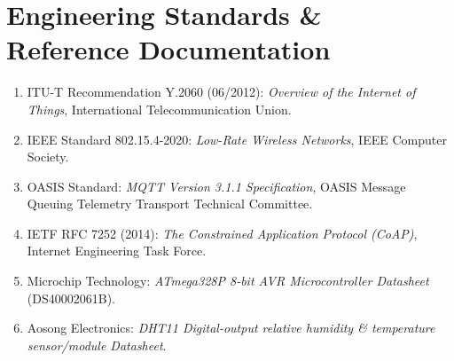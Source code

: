 \documentclass[11pt,a4paper]{article}
\begin{document}
\newpage

\section{Engineering Standards \& Reference Documentation}
\begin{enumerate}[noitemsep]
    \item ITU-T Recommendation Y.2060 (06/2012): \textit{Overview of the Internet of Things}, International Telecommunication Union.
    \item IEEE Standard 802.15.4-2020: \textit{Low-Rate Wireless Networks}, IEEE Computer Society.
    \item OASIS Standard: \textit{MQTT Version 3.1.1 Specification}, OASIS Message Queuing Telemetry Transport Technical Committee.
    \item IETF RFC 7252 (2014): \textit{The Constrained Application Protocol (CoAP)}, Internet Engineering Task Force.
    \item Microchip Technology: \textit{ATmega328P 8-bit AVR Microcontroller Datasheet} (DS40002061B).
    \item Aosong Electronics: \textit{DHT11 Digital-output relative humidity \& temperature sensor/module Datasheet}.
\end{enumerate}
\end{document}
